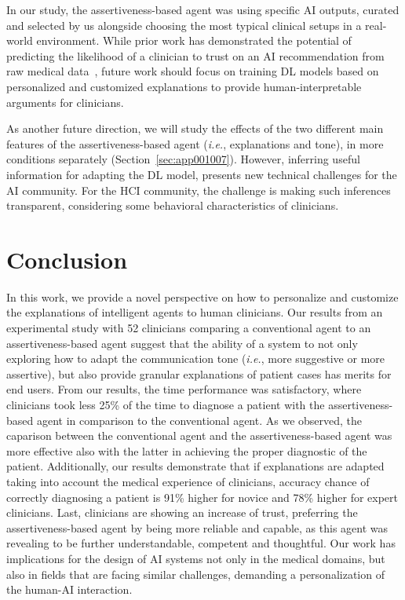 In our study, the assertiveness-based agent was using specific AI outputs, curated and selected by us alongside choosing the most typical clinical setups in a real-world environment.
While prior work has demonstrated the potential of predicting the likelihood of a clinician to trust on an AI recommendation from raw medical data~\cite{pmlr-v97-raghu19a}, future work should focus on training DL models based on personalized and customized explanations to provide human-interpretable arguments for clinicians.

As another future direction, we will study the effects of the two different main features of the assertiveness-based agent ({\it i.e.}, explanations and tone), in more conditions separately (Section~\ref{sec:app001007}).
However, inferring useful information for adapting the DL model, presents new technical challenges for the AI community.
For the HCI community, the challenge is making such inferences transparent, considering some behavioral characteristics of clinicians.

\section{Conclusion}
\label{sec:chap006008}

In this work, we provide a novel perspective on how to personalize and customize the explanations of intelligent agents to human clinicians.
Our results from an experimental study with 52 clinicians comparing a conventional agent to an assertiveness-based agent suggest that the ability of a system to not only exploring how to adapt the communication tone ({\it i.e.}, more suggestive or more assertive), but also provide granular explanations of patient cases has merits for end users.
From our results, the time performance was satisfactory, where clinicians took less 25\% of the time to diagnose a patient with the assertiveness-based agent in comparison to the conventional agent.
As we observed, the caparison between the conventional agent and the assertiveness-based agent was more effective also with the latter in achieving the proper diagnostic of the patient.
Additionally, our results demonstrate that if explanations are adapted taking into account the medical experience of clinicians, accuracy chance of correctly diagnosing a patient is 91\% higher for novice and 78\% higher for expert clinicians.
Last, clinicians are showing an increase of trust, preferring the assertiveness-based agent by being more reliable and capable, as this agent was revealing to be further understandable, competent and thoughtful.
Our work has implications for the design of AI systems not only in the medical domains, but also in fields that are facing similar challenges, demanding a personalization of the human-AI interaction.